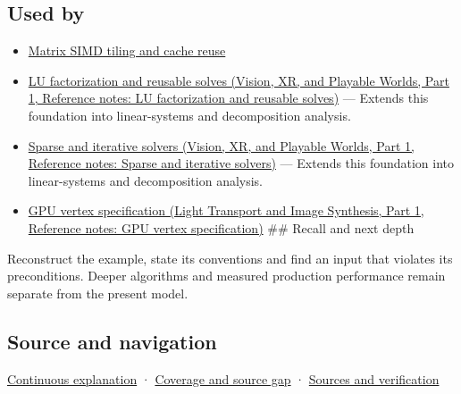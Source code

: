 \subsection{Used by}\label{appendix-ffdc1d4e5350-used-by}

\hypertarget{appendix-ffdc1d4e5350-used-by}{}

\begin{itemize}
\item
  \hyperref[appendix-1bfb7c657105]{Matrix SIMD tiling and cache reuse}
\item
  \href{../07-Vision-XR-and-Playable-Worlds-P01/main.pdf\#nameddest=appendix-55e4b5b0a1e6}{LU factorization and reusable solves (Vision, XR, and Playable Worlds, Part 1, Reference notes: LU factorization and reusable solves)} --- Extends this foundation into linear-systems and decomposition analysis.
\item
  \href{../07-Vision-XR-and-Playable-Worlds-P01/main.pdf\#nameddest=appendix-67c87a3d9e94}{Sparse and iterative solvers (Vision, XR, and Playable Worlds, Part 1, Reference notes: Sparse and iterative solvers)} --- Extends this foundation into linear-systems and decomposition analysis.
\item
  \href{../04-Light-Transport-and-Image-Synthesis-P01/main.pdf\#nameddest=appendix-749ba51a6c25}{GPU vertex specification (Light Transport and Image Synthesis, Part 1, Reference notes: GPU vertex specification)} \#\# Recall and next depth
\end{itemize}

Reconstruct the example, state its conventions and find an input that violates its preconditions. Deeper algorithms and measured production performance remain separate from the present model.

\subsection{Source and navigation}\label{appendix-ffdc1d4e5350-source-and-navigation}

\hypertarget{appendix-ffdc1d4e5350-source-and-navigation}{}

\hyperref[01-foundations-i-ch018-keep-the-promises-visible-while-moving-between-representations]{Continuous explanation} · \hyperref[appendix-fd090d982a15-phase-7---parts-601-700]{Coverage and source gap} · \hyperref[appendix-a103e7846d21-phase-7---source-analysis-and-verification]{Sources and verification}
